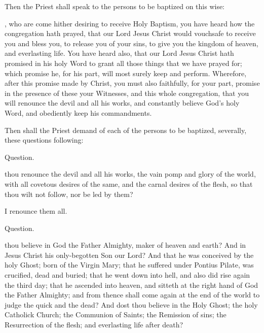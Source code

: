 \begin{rubric}
Then the Priest shall speak to the persons to be baptized on this wise:
\end{rubric}

, who are come hither desiring to receive Holy Baptism, you have heard how the congregation hath prayed, that our Lord Jesus Christ would vouchsafe to receive you and bless you, to release you of your sins, to give you the kingdom of heaven, and everlasting life.
You have heard also, that our Lord Jesus Christ hath promised in his holy Word to grant all those things that we have prayed for; which promise he, for his part, will most surely keep and perform.
Wherefore, after this promise made by Christ, you must also faithfully, for your part, promise in the presence of these your Witnesses, and this whole congregation, that you will renounce the devil and all his works, and constantly believe God's holy Word, and obediently keep his commandments.

\begin{rubric}
Then shall the Priest demand of each of the persons to be baptized, severally, these questions following:
\end{rubric}

\begin{center}
Question.
\end{center}

 thou renounce the devil and all his works, the vain pomp and glory of the world, with all covetous desires of the same, and the carnal desires of the flesh, so that thou wilt not follow, nor be led by them?

 I renounce them all.

\newpage

\begin{center}
Question.
\end{center}

 thou believe in God the Father Almighty, maker of heaven and earth?
And in Jesus Christ his only-begotten Son our Lord?
And that he was conceived by the holy Ghost; born of the Virgin Mary; that he suffered under Pontius Pilate, was crucified, dead and buried; that he went down into hell, and also did rise again the third day; that he ascended into heaven, and sitteth at the right hand of God the Father Almighty; and from thence shall come again at the end of the world to judge the quick and the dead?
And dost thou believe in the Holy Ghost; the holy Catholick Church; the Communion of Saints; the Remission of sins; the Resurrection of the flesh; and everlasting life after death?


